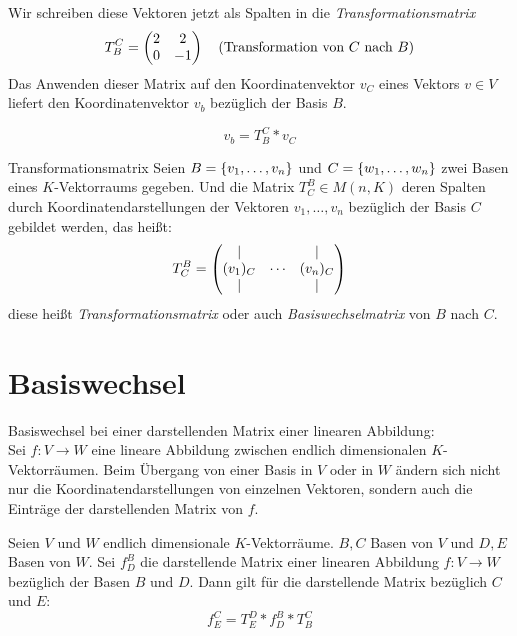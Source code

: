 Wir schreiben diese Vektoren jetzt als Spalten in die \emph{Transformationsmatrix}
\begin{equation*}
	T_B^C=\matrix{2 & 2\\ 0 & -1} \quad\text{(Transformation von $C$ nach $B$)}
\end{equation*}
Das Anwenden dieser Matrix auf den Koordinatenvektor $v_C$ eines Vektors $v\in V$ liefert den Koordinatenvektor $v_b$ bezüglich der Basis $B$.

\begin{equation*}
	v_b=T_B^C*v_C
\end{equation*}

\begin{definition}{Transformationsmatrix}
	Seien $B=\left\{ v_1,\ldots,v_n \right\}$ und $C=\left\{ w_1,\ldots,w_n \right\}$ zwei Basen eines $K$-Vektorraums gegeben. Und die Matrix $T^B_C\in M(n,K)$ deren Spalten durch Koordinatendarstellungen der Vektoren $v_1,\ldots,v_n$ bezüglich der Basis $C$ gebildet werden, das heißt:
	\begin{equation*}
		T_C^B=\matrix{ |&&|\\ (v_1)_C & \cdots & (v_n)_C   \\ | && |}
	\end{equation*}
	diese heißt \emph{Transformationsmatrix} oder auch \emph{Basiswechselmatrix} von $B$ nach $C$.
\end{definition}


\section{Basiswechsel}
Basiswechsel bei einer darstellenden Matrix einer linearen Abbildung:\\
Sei $f:V\rightarrow W$ eine lineare Abbildung zwischen endlich dimensionalen $K$-Vektorräumen. Beim Übergang von einer Basis in $V$ oder in $W$ ändern sich nicht nur die Koordinatendarstellungen von einzelnen Vektoren, sondern auch die Einträge der darstellenden Matrix von $f$.

\begin{satz}{}
	Seien $V$ und $W$ endlich dimensionale $K$-Vektorräume. $B,C$ Basen von $V$ und $D,E$ Basen von $W$.
	Sei $f_D^B$ die darstellende Matrix einer linearen Abbildung $f:V\rightarrow W$ bezüglich der Basen $B$ und $D$.
	Dann gilt für die darstellende Matrix bezüglich $C$ und $E$:
	\begin{equation*}
		f_E^C=T_E^D*f^B_D*T_B^C
	\end{equation*}
\end{satz}

